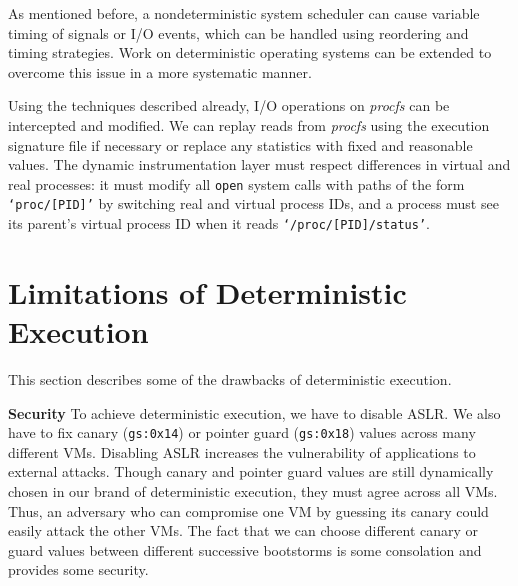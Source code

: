 As mentioned before, a nondeterministic system scheduler
can cause variable timing of signals
or I/O events, which
can be handled using reordering and
timing strategies.
Work on deterministic
operating systems can
be extended to overcome this issue
in a more systematic manner. \newline

 \newline
Using the techniques described
already, I/O operations on {\em procfs} can be intercepted
and modified. We can 
replay reads from {\em procfs} using the execution signature
file if necessary or replace any statistics with fixed and 
reasonable values. The dynamic instrumentation layer 
must respect differences in virtual and real processes:
it must modify all \texttt{open} system calls with paths
of the form \texttt{`proc/[PID]'}
by switching real and virtual process IDs,
and a process must see its 
parent's virtual process ID when it reads
\texttt{`/proc/[PID]/status'}.



\section{Limitations of Deterministic Execution} \label{ch3:issues}
This section describes some of the drawbacks
of deterministic execution. \newline

\noindent \textbf{Security} \newline
To achieve deterministic execution,
we have to disable ASLR. We also have to fix 
canary (\texttt{gs:0x14}) or pointer guard (\texttt{gs:0x18})
 values across many different VMs.
Disabling ASLR increases the vulnerability of
applications to external attacks. 
Though canary and pointer guard
values are still dynamically chosen in
our brand of deterministic execution, 
they must agree across all VMs. Thus,
an adversary  who can compromise one VM by
guessing its canary could easily attack the other VMs.
The fact that we can choose different
canary or guard values between different successive bootstorms
is some consolation and provides some security. \newline

